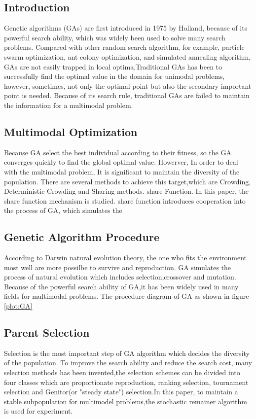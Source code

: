 \documentclass[smallextended]{svjour3}       %
\begin{document}
\begin{multicols}{2}

\section{Introduction}
Genetic algorithms (GAs) are first introduced in 1975 by
Holland\cite{sampson1976adaptation}, because of its powerful search ability,
which was widely been used to solve many search problems. Compared with other
random search algorithm, for example, particle swarm optimization, ant colony
optimization, and simulated annealing algorithm\cite{zabinsky2010random}, GAs
are not easily trapped in local optima,Traditional GAs has been to successfully
find the optimal value in the domain for unimodal problems, however, sometimes,
not only the optimal point but also the secondary important point is needed.
Because of its search rule, traditional GAs are failed to maintain the
information for a multimodal problem.

\subsection{Multimodal Optimization}
Because GA select the best individual according to their fitness, so the GA
converges quickly to find the global optimal value. Howerver, In order to deal
with the multimodal problem, It is significant to maintain the diversity of the
population.  There are several methods to achieve this target,which are
Crowding, Deterministic Crowding and Sharing methods.  share
Function\cite{goldberg1987genetic}. In this paper, the share function mechanism
is studied. share function introduces cooperation into the process of GA, which
simulates the 

\subsection{Genetic Algorithm Procedure}
According to Darwin natural evolution theory, the one who fits the environment
most well are more possilbe to survive and reproduction. GA simulates the
process of natural evolution which includes selection,crossover and mutation.
Because of the powerful search ability of GA,it has been widely used in many
fields for multimodal problems. The procedure diagram of GA as shown in figure
\ref{plot:GA} 
 
\subsection{Parent Selection}
Selection is the most important step of GA algorithm which decides the diversity
of the population.  To improve the search ability and reduce the search cost,
many selection methods \cite{goldberg1991comparative} has been invented,the
selection schemes can be divided into four classes which are proportionate
reproduction, ranking selection, tournament selection and Genitor(or "steady
state") selection.In this paper, to maintain a stable subpopulation for
multimodel problems,the stochastic remainer algorithm is used for experiment.


\end{multicols}
\end{document}
